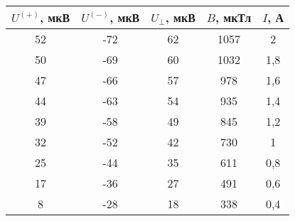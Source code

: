 \begin{table}[h!]
    \begin{center}
        \begin{tabular}{|c|c|c|c|c|}
            \hline
            $U^{(+)}$, мкВ & $U^{(-)}$, мкВ & $U_{\bot}$, мкВ & $B$, мкТл & $I$, А \\ \hline
            52             & -72            & 62              & 1057      & 2      \\ \hline
            50             & -69            & 60              & 1032      & 1,8    \\ \hline
            47             & -66            & 57              & 978       & 1,6    \\ \hline
            44             & -63            & 54              & 935       & 1,4    \\ \hline
            39             & -58            & 49              & 845       & 1,2    \\ \hline
            32             & -52            & 42              & 730       & 1      \\ \hline
            25             & -44            & 35              & 611       & 0,8    \\ \hline
            17             & -36            & 27              & 491       & 0,6    \\ \hline
            8              & -28            & 18              & 338       & 0,4    \\ \hline
            \end{tabular}
    \end{center}
\end{table}